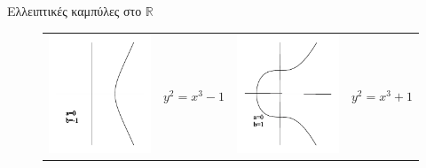 \documentclass[handout]{beamer}
\begin{document}
\begin{frame}[allowframebreaks]{Ελλειπτικές καμπύλες στο $\mathbb R$}
\begin{figure}
\begin{tiny}
\begin{tabular}{cccc}
		\includegraphics[scale=0.25]{qaz1.png} & $y^2 = x^3 - 1 $   &  \includegraphics[scale=0.25]{qaz2.png} &  $y^2 = x^3 + 1 $ \\       

\end{tabular}
\end{tiny}
\end{figure}
\end{frame}
\end{document}
